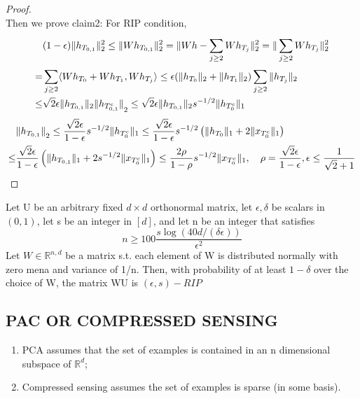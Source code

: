 \begin{theorem}
\begin{proof}
\[        \]
        Then we prove claim2:
        For RIP condition,
        \begin{align*}
            &(1-\epsilon) \Arrowvert h_{T_{0,1}} \Arrowvert^2_2 \le \Arrowvert W h_{T_{0,1}} \Arrowvert^2_2
            = \Arrowvert Wh - \sum^{}_{j \ge 2} W h_{T_j} \Arrowvert^2_2 = \Arrowvert \sum^{}_{j \ge 2} W h_{T_j} \Arrowvert^2_2 \\
            =& \sum^{}_{j \ge 2} \langle W h_{T_0} + W h_{T_1}, W h_{T_j} \rangle \le \epsilon ( \Arrowvert h_{T_0} \Arrowvert_2 + \Arrowvert h_{T_1} \Arrowvert_2)\sum^{}_{j \ge 2} \Arrowvert h_{T_j} \Arrowvert_2 \\
            \le& \sqrt{2} \epsilon \Arrowvert h_{T_{0,1}} \Arrowvert_2 {\Arrowvert h_{T^c_{0,1}} \Arrowvert}_2
            \le \sqrt{2} \epsilon \Arrowvert h_{T_{0,1}} \Arrowvert_2 s^{-1/2} \Arrowvert h_{T^c_0} \Arrowvert_1
        \end{align*}
        \begin{align*}
            &{\Arrowvert h_{T_{0,1}} \Arrowvert}_2 
            \le \frac{\sqrt 2 \epsilon}{1- \epsilon} s^{-1/2} \Arrowvert h_{T^c_{0}} \Arrowvert_1 
            \le \frac{\sqrt 2 \epsilon}{1- \epsilon} s^{-1/2} \left( \Arrowvert h_{T_0} \Arrowvert_1 + 2 \Arrowvert x_{T^c_0} \Arrowvert_1 \right)\\
            \le& \frac{\sqrt 2 \epsilon}{1- \epsilon} \left( \Arrowvert h_{T_{0,1}} \Arrowvert_1 + 2 s^{-1/2} \Arrowvert x_{T^c_{0}} \Arrowvert_1 \right) 
            \le \frac{2 \rho}{1 - \rho}  s^{-1/2} \Arrowvert x_{T^c_0} \Arrowvert_1, \quad \rho = \frac{\sqrt 2 \epsilon}{1 - \epsilon}, \epsilon \le \frac{1}{\sqrt 2 + 1}  
        \end{align*}
    \end{proof}
\end{theorem}

\begin{theorem}
    Let U be an arbitrary fixed $ d\times d $ orthonormal matrix, let $ \epsilon, \delta $ be scalars in $ (0,1) $, let s be an integer in $ [d] $, and let n be an integer that satisfies
    \[
        n \ge 100 \frac{s \log(40d / (\delta \epsilon))}{\epsilon^2} 
    \]
    Let $ W \in \mathbb{R}^{n,d} $ be a matrix {s.t.} each element of W is distributed normally with zero mena and variance of 1/n. Then, with probability of at least $ 1 - \delta $ over the choice of W, the matrix WU is $ (\epsilon, s)-RIP $
\end{theorem}

\subsection{PAC OR COMPRESSED SENSING}%

\begin{enumerate}
    \item PCA assumes that the set of examples is contained in an n dimensional subspace of $ \mathbb{R}^d $;
    \item Compressed sensing assumes the set of examples is sparse (in some basis).
\end{enumerate}


